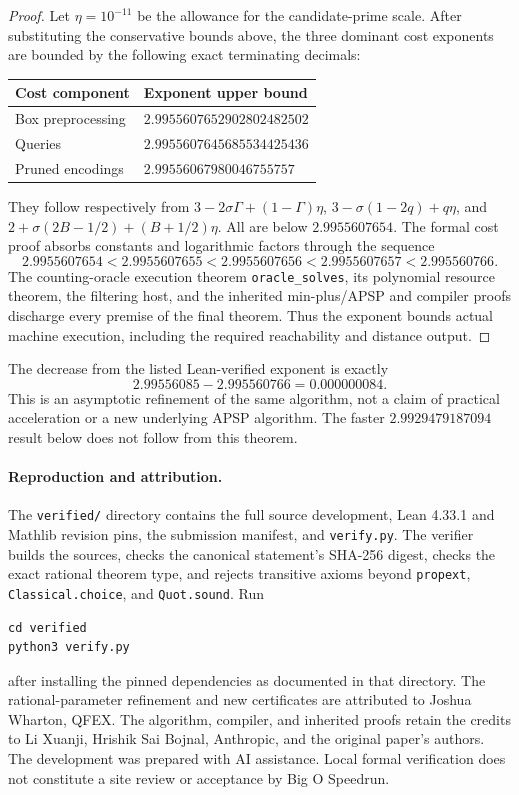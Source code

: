 \documentclass[11pt,a4paper]{article}
\begin{document}
\begin{proof}
Let $\eta=10^{-11}$ be the allowance for the candidate-prime scale.
After substituting the conservative bounds above, the three dominant
cost exponents are bounded by the following exact terminating decimals:
\begin{center}
\begin{tabular}{@{}ll@{}}
\toprule
Cost component & Exponent upper bound\\
\midrule
Box preprocessing & $2.9955607652902802482502$\\
Queries & $2.9955607645685534425436$\\
Pruned encodings & $2.99556067980046755757$\\
\bottomrule
\end{tabular}
\end{center}
They follow respectively from
$3-2\sigma\Gamma+(1-\Gamma)\eta$,
$3-\sigma(1-2q)+q\eta$, and
$2+\sigma(2B-1/2)+(B+1/2)\eta$.
All are below $2.9955607654$. The formal cost proof absorbs constants
and logarithmic factors through the sequence
\[
 2.9955607654 < 2.9955607655 < 2.9955607656
 < 2.9955607657 < 2.995560766.
\]
The counting-oracle execution theorem \texttt{oracle\_solves}, its
polynomial resource theorem, the filtering host, and the inherited
min-plus/APSP and compiler proofs discharge every premise of the final
theorem. Thus the exponent bounds actual machine execution, including
the required reachability and distance output.
\end{proof}

The decrease from the listed Lean-verified exponent is exactly
\[
 2.99556085-2.995560766=0.000000084.
\]
This is an asymptotic refinement of the same algorithm, not a claim of
practical acceleration or a new underlying APSP algorithm. The faster
$2.9929479187094$ result below does not follow from this theorem.

\paragraph{Reproduction and attribution.}
The \texttt{verified/} directory contains the full source development,
Lean 4.33.1 and Mathlib revision pins, the submission manifest, and
\texttt{verify.py}. The verifier builds the sources, checks the canonical
statement's SHA-256 digest, checks the exact rational theorem type, and
rejects transitive axioms beyond \texttt{propext},
\texttt{Classical.choice}, and \texttt{Quot.sound}. Run
\begin{verbatim}
cd verified
python3 verify.py
\end{verbatim}
after installing the pinned dependencies as documented in that directory.
The rational-parameter refinement and new certificates are attributed to
Joshua Wharton, QFEX. The algorithm, compiler, and inherited proofs retain
the credits to Li Xuanji, Hrishik Sai Bojnal, Anthropic, and the original
paper's authors. The development was prepared with AI assistance.
Local formal verification does not constitute a site review or acceptance
by Big O Speedrun.
\end{document}
